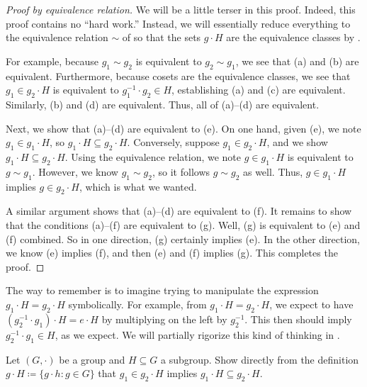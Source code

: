 \documentclass[../main.tex]{subfiles}
\begin{document}
\begin{proof}[Proof by equivalence relation]
    We will be a little terser in this proof. Indeed, this proof contains no ``hard work.'' Instead, we will essentially reduce everything to the equivalence relation $\sim$ of  so that the sets $g\cdot H$ are the equivalence classes by .

    For example, because $g_1\sim g_2$ is equivalent to $g_2\sim g_1$, we see that (a) and (b) are equivalent. Furthermore, because cosets are the equivalence classes, we see that $g_1\in g_2\cdot H$ is equivalent to $g_1^{-1}\cdot g_2\in H$, establishing (a) and (c) are equivalent. Similarly, (b) and (d) are equivalent. Thus, all of (a)--(d) are equivalent.
    
    Next, we show that (a)--(d) are equivalent to (e). On one hand, given (e), we note $g_1\in g_1\cdot H$, so $g_1\cdot H\subseteq g_2\cdot H$. Conversely, suppose $g_1\in g_2\cdot H$, and we show $g_1\cdot H\subseteq g_2\cdot H$. Using the equivalence relation, we note $g\in g_1\cdot H$ is equivalent to $g\sim g_1$. However, we know $g_1\sim g_2$, so it follows $g\sim g_2$ as well. Thus, $g\in g_1\cdot H$ implies $g\in g_2\cdot H$, which is what we wanted.
    
    A similar argument shows that (a)--(d) are equivalent to (f). It remains to show that the conditions (a)--(f) are equivalent to (g). Well, (g) is equivalent to (e) and (f) combined. So in one direction, (g) certainly implies (e). In the other direction, we know (e) implies (f), and then (e) and (f) implies (g). This completes the proof.
\end{proof}
\begin{remark} \label{rem:unjustified-manip}
    The way to remember  is to imagine trying to manipulate the expression $g_1\cdot H=g_2\cdot H$ symbolically. For example, from $g_1\cdot H=g_2\cdot H$, we expect to have $\left(g_2^{-1}\cdot g_1\right)\cdot H=e\cdot H$ by multiplying on the left by $g_2^{-1}$. This then should imply $g_2^{-1}\cdot g_1\in H$, as we expect. We will partially rigorize this kind of thinking in .
\end{remark}
\begin{exe}
    Let $(G,\cdot)$ be a group and $H\subseteq G$ a subgroup. Show directly from the definition $g\cdot H\coloneqq\{g\cdot h:g\in G\}$ that $g_1\in g_2\cdot H$ implies $g_1\cdot H\subseteq g_2\cdot H$.
\end{exe}
\end{document}
